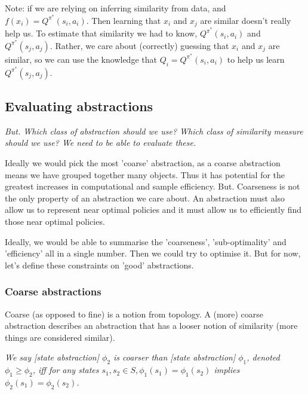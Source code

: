 Note: if we are relying on inferring similarity from data, and $f(x_i) = Q^{\pi^{* }}(s_i, a_i)$.
Then learning that $x_i$ and $x_j$ are similar doesn't really help us.
To estimate that similarity we had to know, $Q^{\pi^{* }}(s_i, a_i)$ and $Q^{\pi^{* }}(s_j, a_j)$.
Rather, we care about (correctly) guessing that $x_i$ and $x_j$ are similar, so we can
use the knowledge that $Q_i = Q^{\pi^{* }}(s_i, a_i)$ to help us learn $Q^{\pi^{* }}(s_j, a_j)$.

\subsection{Evaluating abstractions}

\begin{displayquote}
\textit{But.
Which class of abstraction should we use?
Which class of similarity measure should we use?
We need to be able to evaluate these.}
\end{displayquote}

Ideally we would pick the most 'coarse' abstraction, as a coarse abstraction means we have grouped together many objects.
Thus it has potential for the greatest increases in computational and sample efficiency.
But. Coarseness is not the only property of an abstraction we care about.
An abstraction must also allow us to represent near optimal policies and it must allow us
to efficiently find those near optimal policies.

Ideally, we would be able to summarise the 'coarseness', 'sub-optimality' and 'efficiency' all in a single number.
Then we could try to optimise it. But for now, let's define these constraints on 'good' abstractions.

\subsubsection{Coarse abstractions}


Coarse (as opposed to fine) is a notion from topology.
A (more) coarse abstraction describes an abstraction that has a looser
notion of similarity (more things are considered similar). \footnotemark[24]


\textit{We say [state abstraction] $\phi_2$ is coarser than [state abstraction] $\phi_1$, denoted $\phi_1 \ge \phi_2$,
iff for any states $s_1, s_2 \in S, \phi_1(s_1) = \phi_1(s_2)$ implies $\phi_2(s_1) = \phi_2(s_2)$.} \cite{Littman2006}

